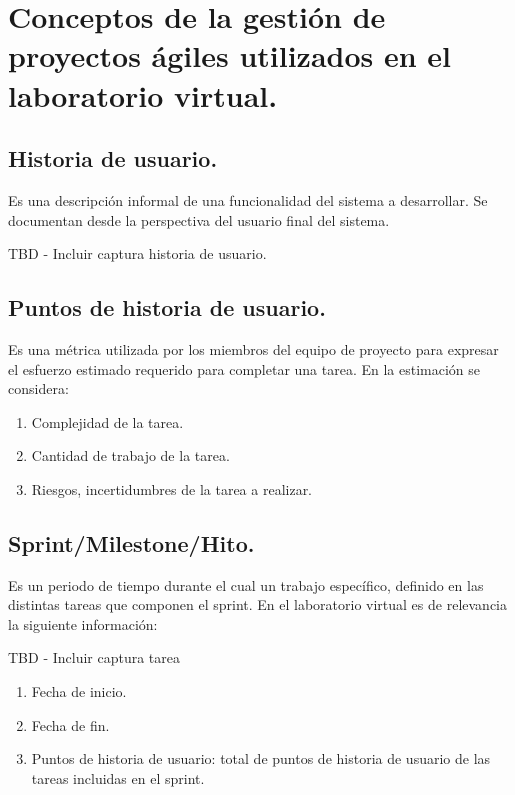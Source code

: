
\section{Conceptos de la gestión de proyectos ágiles utilizados en el laboratorio virtual.}

\subsection{Historia de usuario.}

Es una descripción informal de una funcionalidad del sistema a desarrollar. Se documentan desde la perspectiva del usuario final del sistema.

TBD - Incluir captura historia de usuario.

\subsection{Puntos de historia de usuario.}

Es una métrica utilizada por los miembros del equipo de proyecto para expresar el esfuerzo estimado requerido para completar una tarea. En la estimación se considera:

\begin{enumerate}
	\item Complejidad de la tarea.
	\item Cantidad de trabajo de la tarea.
	\item Riesgos, incertidumbres de la tarea a realizar.	
\end{enumerate}

\subsection{Sprint/Milestone/Hito.}

Es un periodo de tiempo durante el cual un trabajo específico, definido en las distintas tareas que componen el sprint. En el laboratorio virtual es de relevancia la siguiente información:

TBD - Incluir captura tarea

\begin{enumerate}
	\item Fecha de inicio.
	\item Fecha de fin.
	\item Puntos de historia de usuario: total de puntos de historia de usuario de las tareas incluidas en el sprint.	
\end{enumerate}

